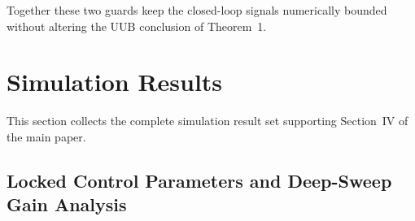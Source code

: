\documentclass[10pt,journal]{IEEEtran}
\begin{document}
Together these two guards keep the closed-loop signals numerically bounded without altering the UUB conclusion of Theorem~1.


\section{Simulation Results}
\label{sec:sup-results}
This section collects the complete simulation result set supporting Section~IV of the main paper.

\subsection{Locked Control Parameters and Deep-Sweep Gain Analysis}
\label{sec:sup-gains}
\end{document}
